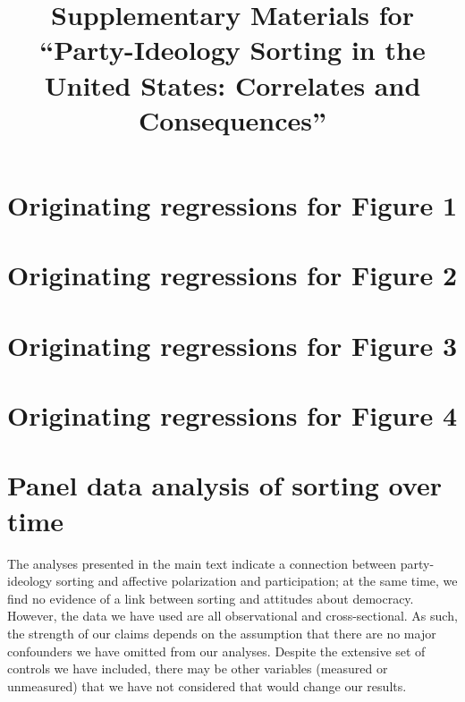 \documentclass[10pt,landscape]{article}
\title{Supplementary Materials for \\ ``Party-Ideology Sorting in the United States: Correlates and Consequences''}
\author{}
\date{}
\begin{document}
\maketitle
\clearpage
\tableofcontents
\listoffigures
\listoftables
\clearpage


\section{Originating regressions for Figure 1}

\clearpage

\section{Originating regressions for Figure 2}

\clearpage

\section{Originating regressions for Figure 3}

\clearpage

\clearpage

\clearpage

\clearpage

\section{Originating regressions for Figure 4}

\clearpage

\clearpage

\clearpage

\clearpage

\section{Panel data analysis of sorting over time}
The analyses presented in the main text indicate a connection between party-ideology sorting and affective polarization and participation; at the same time, we find no evidence of a link between sorting and attitudes about democracy.
However, the data we have used are all observational and cross-sectional. 
As such, the strength of our claims depends on the assumption that there are no major confounders we have omitted from our analyses. 
Despite the extensive set of controls we have included, there may be other variables (measured or unmeasured) that we have not considered that would change our results.
\end{document}
